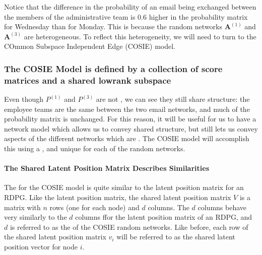 \documentclass[letterpaper,10pt,english]{jupyterBook}
\begin{document}
\noindent{}

\sphinxAtStartPar
Notice that the difference in the probability of an email being exchanged between the members of the administrative team is \(0.6\) higher in the probability matrix for Wednesday than for Monday. This is because the random networks \(\mathbf A^{(1)}\) and \(\mathbf A^{(3)}\) are heterogeneous. To reflect this heterogeneity, we will need to turn to the COmmon Subspace Independent Edge (COSIE) model.


\subsubsection{The COSIE Model is defined by a collection of score matrices and a shared low\sphinxhyphen{}rank subspace}
\label{\detokenize{representations/ch5/multi-network-models:the-cosie-model-is-defined-by-a-collection-of-score-matrices-and-a-shared-low-rank-subspace}}
\sphinxAtStartPar
Even though \(P^{(1)}\) and \(P^{(3)}\) are not , we can see they still share  structure: the employee teams are the same between the two email networks, and much of the probability matrix is unchanged. For this reason, it will be useful for us to have a network model which allows us to convey  shared structure, but still lets us convey aspects of the different networks which are . The COSIE model will accomplish this using a , and unique  for each of the random networks.


\paragraph{The Shared Latent Position Matrix Describes Similarities}
\label{\detokenize{representations/ch5/multi-network-models:the-shared-latent-position-matrix-describes-similarities}}
\sphinxAtStartPar
The  for the COSIE model is quite similar to the latent position matrix for an RDPG. Like the latent position matrix, the shared latent position matrix \(V\) is a matrix with \(n\) rows (one for each node) and \(d\) columns. The \(d\) columns behave very similarly to the \(d\) columns ffor the latent position matrix of an RDPG, and \(d\) is referred to as the  of the COSIE random networks. Like before, each row of the shared latent position matrix \(v_i\) will be referred to as the shared latent position vector for node \(i\).
\end{document}
